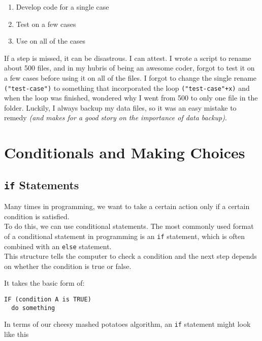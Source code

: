 \documentclass[
]{book}
\providecommand{\tightlist}{%
  \setlength{\itemsep}{0pt}\setlength{\parskip}{0pt}}
\begin{document}
\begin{enumerate}
\def\labelenumi{\arabic{enumi}.}
\tightlist
\item
  Develop code for a single case
\item
  Test on a few cases
\item
  Use on all of the cases
\end{enumerate}

If a step is missed, it can be disastrous. I can attest. I wrote a script to rename about 500 files, and in my hubris of being an awesome coder, forgot to test it on a few cases before using it on all of the files. I forgot to change the single rename \texttt{("test-case")} to something that incorporated the loop \texttt{("test-case"+x)} and when the loop was finished, wondered why I went from 500 to only one file in the folder. Luckily, I always backup my data files, so it was an easy mistake to remedy \emph{(and makes for a good story on the importance of data backup)}.

\chapter{Conditionals and Making Choices}\label{conditionals-and-making-choices}

\section{\texorpdfstring{\texttt{if} Statements}{if Statements}}\label{if-statements}

Many times in programming, we want to take a certain action only if a certain condition is satisfied.\\

To do this, we can use conditional statements. The most commonly used format of a conditional statement in programming is an \texttt{if} statement, which is often combined with an \texttt{else} statement.\\

This structure tells the computer to check a condition and the next step depends on whether the condition is true or false.

It takes the basic form of:

\begin{verbatim}
IF (condition A is TRUE)
  do something
\end{verbatim}

In terms of our cheesy mashed potatoes algorithm, an \texttt{if} statement might look like this
\end{document}
